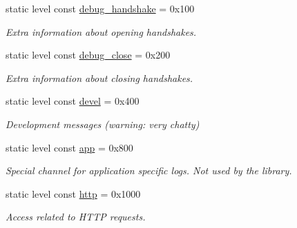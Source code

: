 \begin{DoxyCompactItemize}
\mbox{\label{structwebsocketpp_1_1log_1_1alevel_a5756fbbc77e431534a43072f944283fc}} 
static level const \mbox{\hyperlink{structwebsocketpp_1_1log_1_1alevel_a5756fbbc77e431534a43072f944283fc}{debug\+\_\+handshake}} = 0x100
\begin{DoxyCompactList}\small\item\em Extra information about opening handshakes. \end{DoxyCompactList}\item 
\mbox{\label{structwebsocketpp_1_1log_1_1alevel_a8af43767d3814885f55495bf9f5f4df4}} 
static level const \mbox{\hyperlink{structwebsocketpp_1_1log_1_1alevel_a8af43767d3814885f55495bf9f5f4df4}{debug\+\_\+close}} = 0x200
\begin{DoxyCompactList}\small\item\em Extra information about closing handshakes. \end{DoxyCompactList}\item 
\mbox{\label{structwebsocketpp_1_1log_1_1alevel_a65ec21c75999c993c25c72569018f576}} 
static level const \mbox{\hyperlink{structwebsocketpp_1_1log_1_1alevel_a65ec21c75999c993c25c72569018f576}{devel}} = 0x400
\begin{DoxyCompactList}\small\item\em Development messages (warning\+: very chatty) \end{DoxyCompactList}\item 
\mbox{\label{structwebsocketpp_1_1log_1_1alevel_aaf67c94a68502c49308489ff01d8d0a8}} 
static level const \mbox{\hyperlink{structwebsocketpp_1_1log_1_1alevel_aaf67c94a68502c49308489ff01d8d0a8}{app}} = 0x800
\begin{DoxyCompactList}\small\item\em Special channel for application specific logs. Not used by the library. \end{DoxyCompactList}\item 
\mbox{\label{structwebsocketpp_1_1log_1_1alevel_af6e731e5771ab1a2267f79e5b9b8183a}} 
static level const \mbox{\hyperlink{structwebsocketpp_1_1log_1_1alevel_af6e731e5771ab1a2267f79e5b9b8183a}{http}} = 0x1000
\begin{DoxyCompactList}\small\item\em Access related to H\+T\+TP requests. \end{DoxyCompactList}\item 

\end{DoxyCompactItemize}
